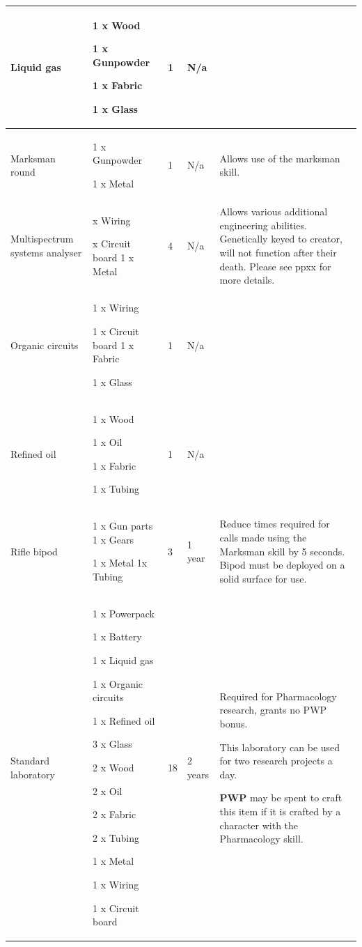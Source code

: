 \begin{table}
\begin{tabular}{|l|l|l|l|l|} \hline 
Liquid gas & 1 x Wood\par 1 x Gunpowder\par 1 x Fabric\par 1 x Glass & 1 & N/a &  \\
 \hline Marksman round & 1 x Gunpowder\par 1 x Metal & 1 & N/a & Allows use of the marksman skill. \\
 \hline Multispectrum systems analyser &

x Wiring

x Circuit board 1 x Metal

 & 4 & N/a & Allows various additional engineering abilities. Genetically keyed to creator, will not function after their death. Please see ppxx for more details. \\
 \hline Organic circuits & 1 x Wiring\par 1 x Circuit board 1 x Fabric\par 1 x Glass & 1 & N/a &  \\
 \hline Refined oil & 1 x Wood\par 1 x Oil\par 1 x Fabric\par 1 x Tubing & 1 & N/a &  \\
 \hline Rifle bipod & 1 x Gun parts 1 x Gears\par 1 x Metal 1x Tubing & 3 & 1 year & Reduce times required for calls made using the Marksman skill by 5 seconds. Bipod must be deployed on a solid surface for use. \\
 \hline Standard laboratory & 1 x Powerpack\par 1 x Battery\par 1 x Liquid gas\par 1 x Organic circuits\par 1 x Refined oil\par 3 x Glass\par 2 x Wood\par 2 x Oil\par 2 x Fabric\par 2 x Tubing\par 1 x Metal\par 1 x Wiring\par 1 x Circuit board & 18 & 2 years & Required for Pharmacology research, grants no PWP bonus.\par This laboratory can be used for two research projects a day.\par \textbf{PWP} may be spent to craft this item if it is crafted by a character with the Pharmacology skill. \\

\end{tabular}
\end{table}
